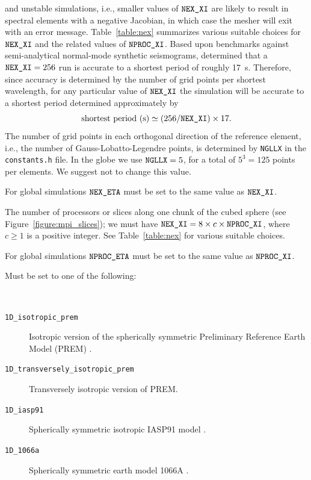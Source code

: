 \begin{description}
and unstable simulations, i.e., smaller values of $\mbox{\texttt{NEX\_XI}}$ are likely
to result in spectral elements with a negative Jacobian, in which
case the mesher will exit with an error message. Table~\ref{table:nex}
summarizes various suitable choices for $\mbox{\texttt{NEX\_XI}}$ and the related
values of $\mbox{\texttt{NPROC\_XI}}$. Based upon benchmarks against semi-analytical
normal-mode synthetic seismograms, \citet{KoTr02a,KoTr02b} determined
that a $\mbox{\texttt{NEX\_XI}}=256$ run is accurate to a shortest period of roughly
17~s. Therefore, since accuracy is determined by the number of grid
points per shortest wavelength, for any particular value of $\mbox{\texttt{NEX\_XI}}$
the simulation will be accurate to a shortest period determined approximately
by
\begin{equation}
\mbox{shortest period (s)}\simeq(256/\mbox{\texttt{NEX\_XI}})\times17.\label{eq:shortest_period}
\end{equation}
 The number of grid points in each orthogonal direction of the reference
element, i.e., the number of Gauss-Lobatto-Legendre points, is determined
by \texttt{NGLLX} in the \texttt{constants.h} file. In the globe we
use $\mbox{\texttt{NGLLX}}=5$, for a total of $5^{3}=125$ points
per elements. We suggest not to change this value.
%
\item [{\texttt{NEX\_ETA}}] For global simulations $\mbox{\texttt{NEX\_ETA}}$ must be set to the same value as $\mbox{\texttt{NEX\_XI}}$.
%
\item [{\texttt{NPROC\_XI}}] The number of processors or slices along one chunk
of the cubed sphere (see Figure~\ref{figure:mpi_slices}); we must
have $\mbox{\texttt{NEX\_XI}}=8\times c\times\mbox{\texttt{NPROC\_XI}}$, where $c\ge1$ is a positive
integer. See Table~\ref{table:nex} for various suitable choices.
%
\item [{\texttt{NPROC\_ETA}}] For global simulations $\mbox{\texttt{NPROC\_ETA}}$ must be set to the same value as $\mbox{\texttt{NPROC\_XI}}$.
%
\item [{\texttt{MODEL}}] Must be set to one of the following:
%
\item [{\textmd{1D~models~with~real~structure:}}]~
\begin{description}
\item [{\texttt{1D\_isotropic\_prem}}] Isotropic version of the spherically
symmetric Preliminary Reference Earth Model (PREM) \citep{DzAn81}.
%
\item [{\texttt{1D\_transversely\_isotropic\_prem}}] Transversely isotropic version of PREM.
%
\item [{\texttt{1D\_iasp91}}] Spherically symmetric isotropic IASP91 model \citep{KeEn91}.
%
\item [{\texttt{1D\_1066a}}] Spherically symmetric earth model 1066A \citep{gilbertdziewonski1975}.

\end{description}
\end{description}
